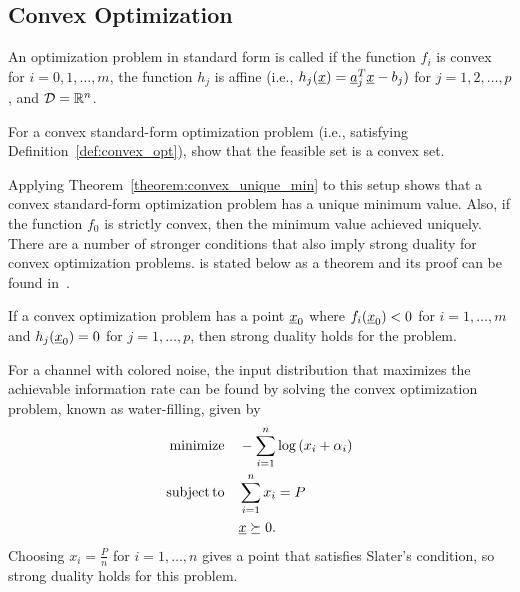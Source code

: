 \subsection{Convex Optimization}

\begin{definition} \label{def:convex_opt}
An optimization problem in standard form is called  if the function $f_i$ is convex for $i=0,1,\ldots,m$, the function $h_j$ is affine (i.e., $h_j(\underline{x}) = \underline{a}_j^T \underline{x} - b_j)$ for $j=1,2,\ldots,p$, and $\mathcal{D}=\mathbb{R}^n$. 
\end{definition}

\begin{problem}
For a convex standard-form optimization problem (i.e.,  satisfying Definition~\ref{def:convex_opt}), show that the feasible set is a convex set.
\end{problem}

Applying Theorem~\ref{theorem:convex_unique_min} to this setup shows that a convex standard-form optimization problem has a unique minimum value.
Also, if the function $f_0$ is strictly convex, then the minimum value achieved uniquely.
There are a number of stronger conditions that also imply strong duality for convex optimization problems.
 is stated below as a theorem and its proof can be found in~\cite[Sec.~5.3.2]{Boyd-2004}.
 
\begin{theorem}
If a convex optimization problem has a point $\underline{x}_0$ where $f_i(\underline{x}_0) < 0$ for $i=1,\ldots,m$ and $h_j (\underline{x}_0) = 0$ for $j=1,\ldots,p$, then strong duality holds for the problem.
\end{theorem}


\begin{example}
For a channel with colored noise, the input distribution that maximizes the achievable information rate can be found by solving the convex optimization problem, known as water-filling, given by
\begin{align*}
\mathrm{minimize} \quad & -\sum_{i=1}^n \log \left( x_i + \alpha_i \right) \\
\mathrm{subject\,to} \quad & \sum_{i=1}^n x_i = P \\
& \underline{x} \succeq 0.
\end{align*}
Choosing $x_i = \frac{P}{n}$ for $i=1,\ldots,n$ gives a point that satisfies Slater's condition, so strong duality holds for this problem.
\end{example}

